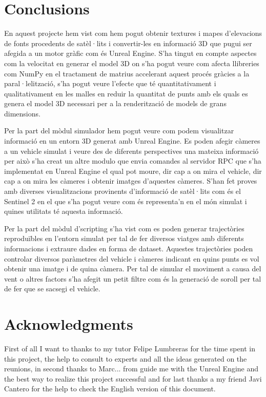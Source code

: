 \documentclass[10pt,a4paper,twocolumn,twoside]{article}
\begin{document}
\section{Conclusions}
En aquest projecte hem vist com hem pogut obtenir textures i mapes d'elevacions de fonts procedents de satèl·lits i convertir-les en informació 3D que pugui ser afegida a un motor gràfic com és Unreal Engine. S'ha tingut en compte aspectes com la velocitat en generar el model 3D on s'ha pogut veure com afecta llibreries com NumPy en el tractament de matrius accelerant aquest procés gràcies a la paral·lelització, s'ha pogut veure l'efecte que té quantitativament i qualitativament en les malles en reduir la quantitat de punts amb els quals es genera el model 3D necessari per a la renderització de models de grans dimensions.

Per la part del mòdul simulador hem pogut veure com podem visualitzar informació en un entorn 3D generat amb Unreal Engine. Es poden afegir càmeres a un vehicle simulat i veure des de diferents perspectives una mateixa informació per això s'ha creat un altre modulo que envia comandes al servidor RPC que s'ha implementat en Unreal Engine el qual pot moure, dir cap a on mira el vehicle, dir cap a on mira les càmeres i obtenir imatges d'aquestes càmeres.
S'han fet proves amb diverses visualitzacions provinents d'informació de satèl·lits com és el Sentinel 2 en el que s'ha pogut veure com és representa'n en el món simulat i quines utilitats té aquesta informació.

Per la part del mòdul d'scripting s'ha vist com es poden generar trajectòries reproduïbles en l'entorn simulat per tal de fer diversos viatges amb diferents informacions i extraure dades en forma de dataset. Aquestes trajectòries poden controlar diversos paràmetres del vehicle i càmeres indicant en quins punts es vol obtenir una imatge i de quina càmera. Per tal de simular el moviment a causa del vent o altres factors s'ha afegit un petit filtre com és la generació de soroll per tal de fer que se sacsegi el vehicle.


\section*{Acknowledgments}

First of all I want to thanks to my tutor Felipe Lumbreras for the time spent in this project, the help to consult to experts and all the ideas generated on the reunions, in second thanks to Marc... from guide me with the Unreal Engine and the best way to realize this project successful and for last thanks a my friend Javi Cantero for the help to check the English version of this document.
\end{document}
